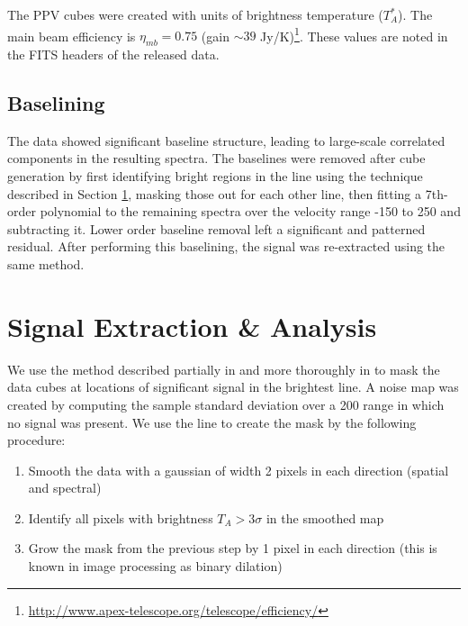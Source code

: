
The PPV cubes were created with units of brightness temperature ($T_A^*$).  The
main beam efficiency is $\eta_{mb} = 0.75$ (gain $\sim39$
Jy/K)\footnote{\url{http://www.apex-telescope.org/telescope/efficiency/}}.
These values are noted in the FITS headers of the released data.



\subsection{Baselining}
\label{sec:baseline}
The data showed significant baseline structure, leading to large-scale
correlated components in the resulting spectra.  The baselines were removed
after cube generation by first identifying bright regions in the \para
\threeohthree line using the technique described in Section \ref{sec:signal},
masking those out for each other line, then fitting a 7th-order polynomial to
the remaining spectra over the velocity range -150 to 250 \kms and subtracting
it.  Lower order baseline removal left a significant and patterned residual.
After performing this baselining, the signal was re-extracted using the same
method.

\section{Signal Extraction \& Analysis}
\label{sec:signal}
We use the method described partially in \citet{Ao2013a} and more thoroughly in
\citet{Dame2011b} to mask the data cubes at locations of significant signal in 
the brightest line. 
A noise map was created by computing the sample standard deviation over a
200 \kms range in which no signal was present.
We use the \para \threeohthree line to create the mask by
the following procedure:

\begin{enumerate}
    \item Smooth the data with a gaussian of width 2 pixels in each direction
        (spatial and spectral)
    \item Identify all pixels with brightness $T_A > 3\sigma$ in the smoothed
        map
    \item Grow the mask from the previous step by 1 pixel in each direction
        (this is known in image processing as binary dilation)
\end{enumerate}

